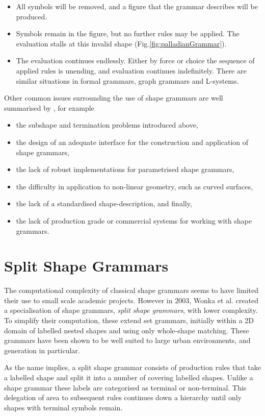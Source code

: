 \begin{itemize}
\item All symbols will be removed, and a figure that the grammar describes will be produced.
\item Symbols remain in the figure, but no further rules may be applied. The evaluation stalls at this invalid shape (Fig.\ref{fig:palladianGrammar}).
\item The evaluation continues endlessly. Either by force or choice the sequence of applied rules is unending, and evaluation continues indefinitely. There are similar situations in formal grammars, graph grammars and L-systems.
\end{itemize}

Other common issues surrounding the use of shape grammars are well summarised by \cite{Gips99}, for example
\begin{itemize}
\item the subshape and termination problems introduced above,
\item the design of an adequate interface for the construction and application of shape grammars, 
\item the lack of robust implementations for parametrised shape grammars, 
\item the difficulty in application to non-linear geometry, such as curved surfaces, 
\item the lack of a standardised shape-description, and finally,
\item the lack of production grade or commercial systems for working with shape grammars. 
\end{itemize}

\section{Split Shape Grammars}

The computational complexity of classical shape grammars seems to have limited their use to small scale academic projects. However in 2003, Wonka et al. created a specialisation of shape grammars, \emph{split shape grammars}\cite{Wonka03}, with lower complexity. To simplify their computation, these extend set grammars, initially within a 2D domain of labelled nested shapes and using only whole-shape matching. These grammars have been shown to be well suited to large urban environments, and \facade{} generation in particular. 

As the name implies, a split shape grammar consists of production rules that take a labelled shape and split it into a number of covering labelled shapes. Unlike a shape grammar these labels are categorised as terminal or non-terminal. This delegation of area to subsequent rules continues down a hierarchy until only shapes with terminal symbols remain.

